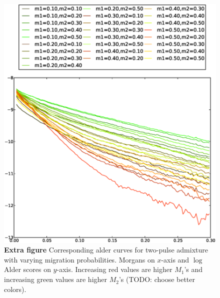 \documentclass[10pt]{article}
\begin{document}
\begin{figure}
	\includegraphics[scale=.6]{alder_ms.eps}
	\caption{
		{\bf Extra figure}
		Corresponding alder curves for two-pulse admixture with varying migration
		probabilities. Morgans on $x$-axis and $\log$ Alder scores on $y$-axis.
		Increasing red values are higher $M_1$'s and increasing green values are
		higher $M_2$'s  (TODO: choose better colors).
	}
\end{figure}
\end{document}
